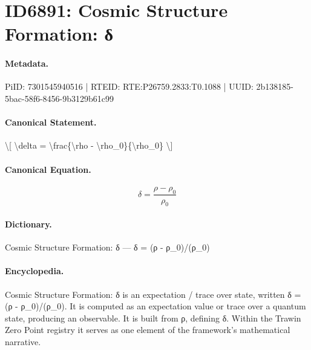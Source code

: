 \section*{ID6891: Cosmic Structure Formation: δ}
\paragraph{Metadata.}
PiID: 7301545940516 | RTEID: RTE:P26759.2833:T0.1088 | UUID: 2b138185-5bac-58f6-8456-9b3129b61c99

\paragraph{Canonical Statement.}
\textbackslash{}[ \textbackslash{}delta = \textbackslash{}frac\{\textbackslash{}rho - \textbackslash{}rho\_0\}\{\textbackslash{}rho\_0\} \textbackslash{}]

\paragraph{Canonical Equation.}
\[
\delta = \frac{\rho - \rho_0}{\rho_0}
\]

\paragraph{Dictionary.}
Cosmic Structure Formation: δ — δ = (ρ - ρ\_0)/(ρ\_0)

\paragraph{Encyclopedia.}
Cosmic Structure Formation: δ is an expectation / trace over state, written δ = (ρ - ρ\_0)/(ρ\_0). It is computed as an expectation value or trace over a quantum state, producing an observable. It is built from ρ, defining δ. Within the Trawin Zero Point registry it serves as one element of the framework's mathematical narrative.
